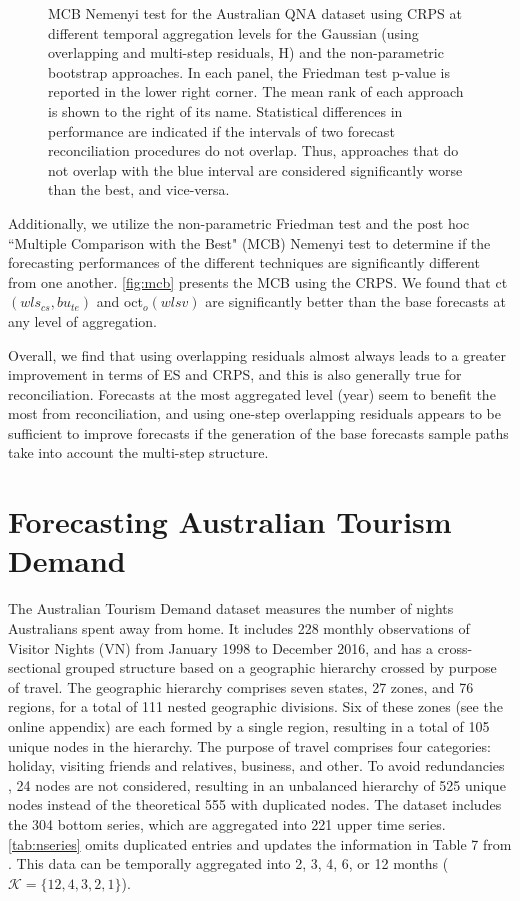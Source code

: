 \documentclass[12pt]{article}
\theoremstyle{definition}
\begin{document}
\begin{figure}[p]
	\caption{MCB Nemenyi test for the Australian QNA dataset using CRPS at different temporal aggregation levels for the Gaussian (using overlapping and multi-step residuals, H) and the non-parametric bootstrap approaches. In each panel, the Friedman test p-value is reported in the lower right corner. The mean rank of each approach is shown to the right of its name. Statistical differences in performance are indicated if the intervals of two forecast reconciliation procedures do not overlap. Thus, approaches that do not overlap with the blue interval are considered significantly worse than the best, and vice-versa.}
	\label{fig:mcb}
\end{figure}

Additionally, we utilize the non-parametric Friedman test and the post hoc “Multiple Comparison with the Best" (MCB) Nemenyi test \citep{koning2005, kourentzes2019, makridakis2022} to determine if the forecasting performances of the different techniques are significantly different from one another.
\autoref{fig:mcb} presents the MCB using the CRPS. We found that ct$(wls_{cs},bu_{te})$ and oct$_o(wlsv)$ are significantly better than the base forecasts at any level of aggregation.

Overall, we find that using overlapping residuals almost always leads to a greater improvement in terms of ES and CRPS, and this is also generally true for reconciliation. Forecasts at the most aggregated level (year) seem to benefit the most from reconciliation, and using one-step overlapping residuals appears to be sufficient to improve forecasts if the generation of the base forecasts sample paths take into account the multi-step structure.


\section{Forecasting Australian Tourism Demand}\label{sec:vn525}

The Australian Tourism Demand dataset \citep{wickramasuriya2019} measures the number of nights Australians spent away from home. It includes 228 monthly observations of Visitor Nights (VN) from January 1998 to December 2016, and has a cross-sectional grouped structure based on a geographic hierarchy crossed by purpose of travel. The geographic hierarchy comprises seven states, 27 zones, and 76 regions, for a total of 111 nested geographic divisions. Six of these zones (see the online appendix) are each formed by a single region, resulting in a total of 105 unique nodes in the hierarchy. The purpose of travel comprises four categories: holiday, visiting friends and relatives, business, and other.
To avoid redundancies \citep{difonzo2022a}, 24 nodes are not considered, resulting in an unbalanced hierarchy of 525 unique nodes instead of the theoretical 555 with duplicated nodes.
The dataset includes the 304 bottom series, which are aggregated into 221 upper time series. \autoref{tab:nseries} omits duplicated entries and updates the information in Table 7 from \cite{wickramasuriya2019}. This data can be temporally aggregated into 2, 3, 4, 6, or 12 months ($\mathcal{K} = \{12,4,3,2,1\}$).
\end{document}
